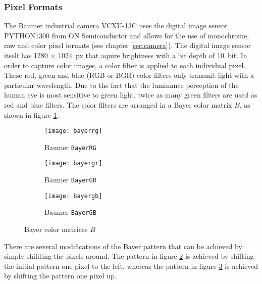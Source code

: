 \subsubsection{Pixel Formats}
\label{subsubsec:pixel_format}

The Baumer industrial camera VCXU-13C uses the digital image sensor PYTHON1300 from ON Semiconductor and allows for the use of monochrome, raw and color pixel formats (see chapter \ref{sec:camera}).
The digital image sensor itself has 1280 $\times$ \SI{1024}{px} that aquire brightness with a bit depth of \SI{10}{bit}.
In order to capture color images, a color filter is applied to each individual pixel.
These red, green and blue (RGB or BGR) color filters only transmit light with a particular wavelength.
Due to the fact that the luminance perception of the human eye is most sensitive to green light, twice as many green filters are used as red and blue filters.
The color filters are arranged in a Bayer color matrix $B$, as shown in figure \ref{subfig:bayerrg}.

\begin{figure}[H]
  \centering
  \begin{subfigure}[b]{0.3\textwidth}
    \centering
    \texttt{[image: bayerrg]}
    \caption{Baumer \texttt{BayerRG}}
    \label{subfig:bayerrg}
  \end{subfigure}
  \begin{subfigure}[b]{0.3\textwidth}
    \centering
    \texttt{[image: bayergr]}
    \caption{Baumer \texttt{BayerGR}}
    \label{subfig:bayergr}
  \end{subfigure}
  \begin{subfigure}[b]{0.3\textwidth}
    \centering
    \texttt{[image: bayergb]}
    \caption{Baumer \texttt{BayerGB}}
    \label{subfig:bayergb}
  \end{subfigure}
  \caption{Bayer color matrices $B$}
  \label{fig:bayer}
\end{figure}

There are several modifications of the Bayer pattern that can be achieved by simply shifiting the pixels around.
The pattern in figure \ref{subfig:bayergr} is achieved by shifting the initial pattern one pixel to the left, whereas the pattern in figure \ref{subfig:bayergb} is achieved by shifting the pattern one pixel up.

